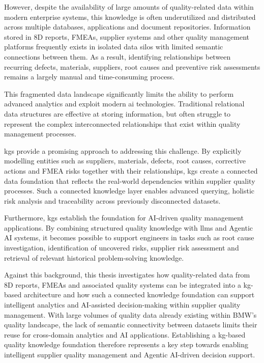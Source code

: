 However, despite the availability of large amounts of quality-related data within modern enterprise systems, this knowledge is often underutilized and distributed across multiple databases, applications and document repositories. Information stored in 8D reports, FMEAs, supplier systems and other quality management platforms frequently exists in isolated data silos with limited semantic connections between them. As a result, identifying relationships between recurring defects, materials, suppliers, root causes and preventive risk assessments remains a largely manual and time-consuming process.

This fragmented data landscape significantly limits the ability to perform advanced analytics and exploit modern \ac{ai} technologies. Traditional relational data structures are effective at storing information, but often struggle to represent the complex interconnected relationships that exist within quality management processes.

\acp{kg} provide a promising approach to addressing this challenge. By explicitly modelling entities such as suppliers, materials, defects, root causes, corrective actions and FMEA risks together with their relationships, \acp{kg} create a connected data foundation that reflects the real-world dependencies within supplier quality processes. Such a connected knowledge layer enables advanced querying, holistic risk analysis and traceability across previously disconnected datasets.

Furthermore, \acp{kg} establish the foundation for AI-driven quality management applications. By combining structured quality knowledge with \acp{llm} and Agentic AI systems, it becomes possible to support engineers in tasks such as root cause investigation, identification of uncovered risks, supplier risk assessment and retrieval of relevant historical problem-solving knowledge.

Against this background, this thesis investigates how quality-related data from 8D reports, FMEAs and associated quality systems can be integrated into a \ac{kg}-based architecture and how such a connected knowledge foundation can support intelligent analytics and AI-assisted decision-making within supplier quality management. With large volumes of quality data already existing within BMW's quality landscape, the lack of semantic connectivity between datasets limits their reuse for cross-domain analytics and AI applications. Establishing a \ac{kg}-based quality knowledge foundation therefore represents a key step towards enabling intelligent supplier quality management and Agentic AI-driven decision support.

